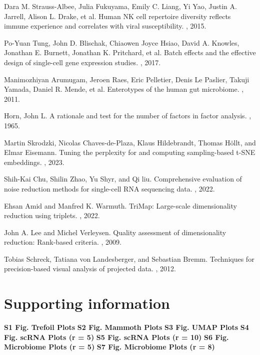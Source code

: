 \documentclass{article}
\begin{document}
\begin{thebibliography}{10}
Dara M. Strauss-Albee, Julia Fukuyama, Emily C. Liang, Yi Yao, Justin A. Jarrell, Alison L. Drake, et al.
\newblock Human NK cell repertoire diversity reflects immune experience and correlates with viral susceptibility.
, 2015.

 Po-Yuan Tung, John D. Blischak, Chiaowen Joyce Hsiao, David A. Knowles, Jonathan E. Burnett, Jonathan K. Pritchard, et al.
 \newblock Batch effects and the effective design of single-cell gene expression studies.
 , 2017.

Manimozhiyan Arumugam, Jeroen Raes, Eric Pelletier, Denis Le Paslier, Takuji Yamada, Daniel R. Mende, et al.
\newblock Enterotypes of the human gut microbiome.
, 2011.

Horn, John L.
\newblock A rationale and test for the number of factors in factor analysis.
, 1965.

Martin Skrodzki, Nicolas Chaves-de-Plaza, Klaus Hildebrandt, Thomas H\"ollt, and Elmar Eisemann.
\newblock Tuning the perplexity for and computing sampling-based t-SNE embeddings.
, 2023.

Shih-Kai Chu, Shilin Zhao, Yu Shyr, and Qi liu.
\newblock Comprehensive evaluation of noise reduction methods for single-cell RNA sequencing data.
, 2022.

Ehsan Amid and Manfred K. Warmuth. 
\newblock TriMap: Large-scale dimensionality reduction using triplets. 
, 2022.

John A. Lee and Michel Verleysen.
\newblock Quality assessment of dimensionality reduction: Rank-based criteria.
, 2009.

Tobias Schreck, Tatiana von Landesberger, and Sebastian Bremm.
\newblock Techniques for precision-based visual analysis of projected data.
, 2012.

\end{thebibliography}

\section{Supporting information}
\textbf{S1 Fig. Trefoil Plots}
\newline\textbf{S2 Fig. Mammoth Plots}
\newline\textbf{S3 Fig. UMAP Plots}
\newline\textbf{S4 Fig. scRNA Plots (r = 5)}
\newline\textbf{S5 Fig. scRNA Plots (r = 10)}
\newline\textbf{S6 Fig. Microbiome Plots (r = 5)}
\newline\textbf{S7 Fig. Microbiome Plots (r = 8)}
\end{document}
